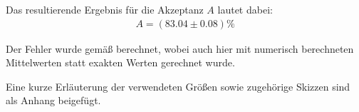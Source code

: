 

Das resultierende Ergebnis für die Akzeptanz $A$ lautet dabei:
\begin{eqnarray}
A = (83.04 \pm 0.08)\%
\end{eqnarray}

Der Fehler wurde gemäß  berechnet, wobei auch hier mit numerisch
berechneten Mittelwerten statt exakten Werten gerechnet wurde.

Eine kurze Erläuterung der verwendeten Größen sowie zugehörige Skizzen sind als
Anhang beigefügt.